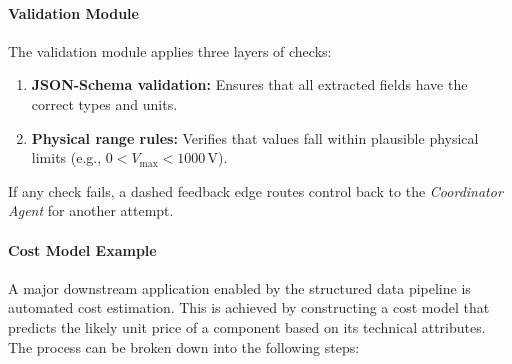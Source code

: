 \paragraph{Validation Module}  
The validation module applies three layers of checks:
\begin{enumerate}
  \item \textbf{JSON-Schema validation:} Ensures that all extracted fields have the correct types and units.
  \item \textbf{Physical range rules:} Verifies that values fall within plausible physical limits (e.g., $0 < V_{\max} < 1000\,\mathrm{V}$).
\end{enumerate}
If any check fails, a dashed feedback edge routes control back to the \emph{Coordinator Agent} for another attempt.

\paragraph{Cost Model Example}  
A major downstream application enabled by the structured data pipeline is automated cost estimation. This is achieved by constructing a cost model that predicts the likely unit price of a component based on its technical attributes. The process can be broken down into the following steps:

